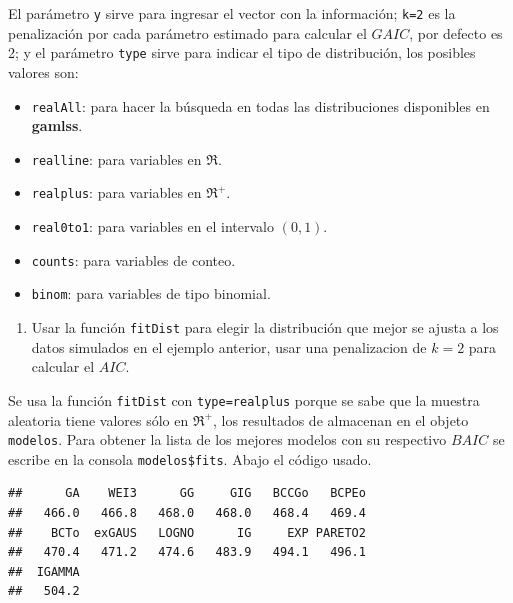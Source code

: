 \documentclass[10pt,]{krantz}
\makeatletter
\newenvironment{Shaded}{\begin{snugshade}}{\end{snugshade}}
\newcommand{\KeywordTok}[1]{\textcolor[rgb]{0.13,0.29,0.53}{\textbf{{#1}}}}
\newcommand{\DataTypeTok}[1]{\textcolor[rgb]{0.13,0.29,0.53}{{#1}}}
\newcommand{\DecValTok}[1]{\textcolor[rgb]{0.00,0.00,0.81}{{#1}}}
\newcommand{\StringTok}[1]{\textcolor[rgb]{0.31,0.60,0.02}{{#1}}}
\newcommand{\NormalTok}[1]{{#1}}
\providecommand{\tightlist}{%
  \setlength{\itemsep}{0pt}\setlength{\parskip}{0pt}}
\newenvironment{kframe}{%
\medskip{}
\setlength{\fboxsep}{.8em}
 \def\at@end@of@kframe{}%
 \ifinner\ifhmode%
  \def\at@end@of@kframe{\end{minipage}}%
  \begin{minipage}{\columnwidth}%
 \fi\fi%
 \def\FrameCommand##1{\hskip\@totalleftmargin \hskip-\fboxsep
 \colorbox{shadecolor}{##1}\hskip-\fboxsep
     \hskip-\linewidth \hskip-\@totalleftmargin \hskip\columnwidth}%
 \MakeFramed {\advance\hsize-\width
   \@totalleftmargin\z@ \linewidth\hsize
   \@setminipage}}%
 {\par\unskip\endMakeFramed%
 \at@end@of@kframe}
\renewenvironment{Shaded}{\begin{kframe}}{\end{kframe}}
\makeatother
\begin{document}
El parámetro \texttt{y} sirve para ingresar el vector con la
información; \texttt{k=2} es la penalización por cada parámetro estimado
para calcular el \(GAIC\), por defecto es 2; y el parámetro
\texttt{type} sirve para indicar el tipo de distribución, los posibles
valores son:

\begin{itemize}
\tightlist
\item
  \texttt{realAll}: para hacer la búsqueda en todas las distribuciones
  disponibles en \textbf{gamlss}.
\item
  \texttt{realline}: para variables en \(\Re\).
\item
  \texttt{realplus}: para variables en \(\Re^+\).
\item
  \texttt{real0to1}: para variables en el intervalo \((0, 1)\).
\item
  \texttt{counts}: para variables de conteo.
\item
  \texttt{binom}: para variables de tipo binomial.
\end{itemize}

\begin{enumerate}
\def\labelenumi{\arabic{enumi})}
\tightlist
\item
  Usar la función \texttt{fitDist} para elegir la distribución que mejor
  se ajusta a los datos simulados en el ejemplo anterior, usar una
  penalizacion de \(k=2\) para calcular el \(AIC\).
\end{enumerate}

Se usa la función \texttt{fitDist} con
\texttt{type=\textquotesingle{}realplus\textquotesingle{}} porque se
sabe que la muestra aleatoria tiene valores sólo en \(\Re^+\), los
resultados de almacenan en el objeto \texttt{modelos}. Para obtener la
lista de los mejores modelos con su respectivo \(BAIC\) se escribe en la
consola \texttt{modelos\$fits}. Abajo el código usado.

\begin{Shaded}
\end{Shaded}

\begin{verbatim}
##      GA    WEI3      GG     GIG   BCCGo   BCPEo 
##   466.0   466.8   468.0   468.0   468.4   469.4 
##    BCTo  exGAUS   LOGNO      IG     EXP PARETO2 
##   470.4   471.2   474.6   483.9   494.1   496.1 
##  IGAMMA 
##   504.2
\end{verbatim}
\end{document}
